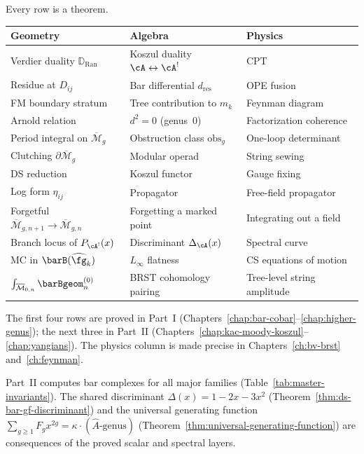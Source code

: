 \begin{remark}
\label{rem:master-functorial}
Every row is a theorem.
\begin{center}
\small
\begin{tabular}{lll}
\textbf{Geometry} & \textbf{Algebra} & \textbf{Physics} \\ \hline
Verdier duality $\mathbb{D}_{\mathrm{Ran}}$
  & Koszul duality $\cA \leftrightarrow \cA^!$
  & CPT \\[2pt]
Residue at $D_{ij}$
  & Bar differential $d_{\mathrm{res}}$
  & OPE fusion \\[2pt]
FM boundary stratum
  & Tree contribution to $m_k$
  & Feynman diagram \\[2pt]
Arnold relation
  & $d^2 = 0$ (genus~$0$)
  & Factorization coherence \\[2pt]
Period integral on $\overline{\mathcal{M}}_g$
  & Obstruction class $\mathrm{obs}_g$
  & One-loop determinant \\[2pt]
Clutching $\partial\overline{\mathcal{M}}_g$
  & Modular operad
  & String sewing \\[2pt]
DS reduction
  & Koszul functor
  & Gauge fixing \\[2pt]
Log form $\eta_{ij}$
  & Propagator
  & Free-field propagator \\[2pt]
Forgetful $\overline{\mathcal{M}}_{g,n+1}
  \to \overline{\mathcal{M}}_{g,n}$
  & Forgetting a marked point
  & Integrating out a field \\[2pt]
Branch locus of $P_{\cA^!}(x)$
  & Discriminant $\Delta_\cA(x)$
  & Spectral curve \\[2pt]
MC in $\barB(\widehat{\fg}_k)$
  & $L_\infty$ flatness
  & CS equations of motion \\[2pt]
$\int_{\overline{\mathcal{M}}_{0,n}} \barBgeom^{(0)}_n$
  & BRST cohomology pairing
  & Tree-level string amplitude
\end{tabular}
\end{center}
The first four rows are proved in Part~\textup{I}
(Chapters~\ref{chap:bar-cobar}--\ref{chap:higher-genus});
the next three in Part~\textup{II}
(Chapters~\ref{chap:kac-moody-koszul}--\ref{chap:yangians}).
The physics column is made precise in
Chapters~\ref{ch:bv-brst} and~\ref{ch:feynman}.
\end{remark}

Part~\textup{II} computes bar complexes for all major families
(Table~\ref{tab:master-invariants}).  The shared discriminant
$\Delta(x) = 1 - 2x - 3x^2$
(Theorem~\ref{thm:ds-bar-gf-discriminant}) and the universal
generating function
$\sum_{g \geq 1} F_g x^{2g} = \kappa \cdot (\hat{A}\text{-genus})$
(Theorem~\ref{thm:universal-generating-function}) are consequences
of the proved scalar and spectral layers.


